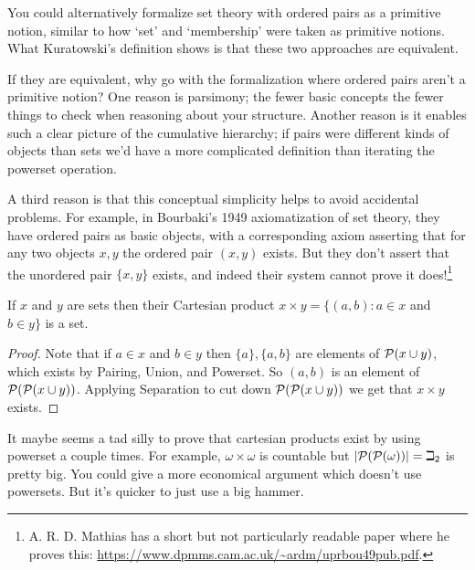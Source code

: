 \documentclass[10pt]{amsart}
\begin{document}
\begin{remark}
You could alternatively formalize set theory with ordered pairs as a primitive notion, similar to how `set' and `membership' were taken as primitive notions. What Kuratowski's definition shows is that these two approaches are equivalent. 

If they are equivalent, why go with the formalization where ordered pairs aren't a primitive notion? One reason is parsimony; the fewer basic concepts the fewer things to check when reasoning about your structure. Another reason is it enables such a clear picture of the cumulative hierarchy; if pairs were different kinds of objects than sets we'd have a more complicated definition than iterating the powerset operation. 

A third reason is that this conceptual simplicity helps to avoid accidental problems. For example, in Bourbaki's 1949 axiomatization of set theory, they have ordered pairs as basic objects, with a corresponding axiom asserting that for any two objects $x,y$ the ordered pair $(x,y)$ exists. But they don't assert that the unordered pair $\{x,y\}$ exists, and indeed their system cannot prove it does!\footnote{A. R. D. Mathias has a short but not particularly readable paper where he proves this: \url{https://www.dpmms.cam.ac.uk/~ardm/uprbou49pub.pdf}.}
\end{remark}

\begin{lemma}
If $x$ and $y$ are sets then their Cartesian product $x \times y = \{ (a,b) : a \in x$ and $b \in y \}$ is a set.
\end{lemma}

\begin{proof}
Note that if $a \in x$ and $b \in y$ then $\{a\}, \{a,b\}$ are elements of $\mathcal{P}(x \cup y)$, which exists by Pairing, Union, and Powerset. So $(a,b)$ is an element of $\mathcal{P}(\mathcal{P}(x \cup y))$. Applying Separation to cut down $\mathcal{P}(\mathcal{P}(x \cup y))$ we get that $x \times y$ exists.
\end{proof}

\begin{remark}
It maybe seems a tad silly to prove that cartesian products exist by using powerset a couple times. For example, $\omega \times \omega$ is countable but $\left\lvert \mathcal{P}(\mathcal{P}(\omega)) \right\rvert = \beth_2$ is pretty big. You could give a more economical argument which doesn't use powersets. But it's quicker to just use a big hammer.
\end{remark}
\end{document}

